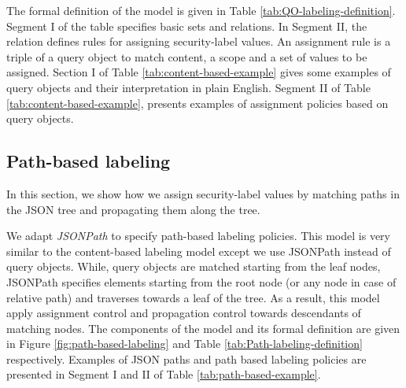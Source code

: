The formal definition of the model is given in Table \ref{tab:QO-labeling-definition}. Segment I of the table specifies basic sets and relations. In Segment II, the relation \textit{ } defines rules for assigning security-label values. An assignment rule is a triple of a query object to match content, a scope and a set of values to be assigned.  Section I of  Table \ref{tab:content-based-example} gives some examples of query objects and their interpretation in plain English.  Segment II of Table \ref{tab:content-based-example}, presents examples of assignment policies based on query objects.





\subsection{Path-based labeling}

In this section, we show how we assign security-label values by matching paths in the JSON tree and propagating them along the tree. 

We adapt \textit{JSONPath} \cite{JSONPath} to specify path-based labeling policies. This model is very similar to the content-based labeling model except we use JSONPath instead of query objects. While, query objects are matched starting from the leaf nodes, JSONPath specifies elements starting from the root node (or any node in case of relative path) and traverses towards a leaf of the tree. As a result, this model apply assignment control and propagation control towards descendants of matching nodes.  The components of the model and its formal definition are given in Figure \ref{fig:path-based-labeling} and Table \ref{tab:Path-labeling-definition} respectively. Examples of JSON paths and path based labeling policies are presented in Segment I and II of Table \ref{tab:path-based-example}.


